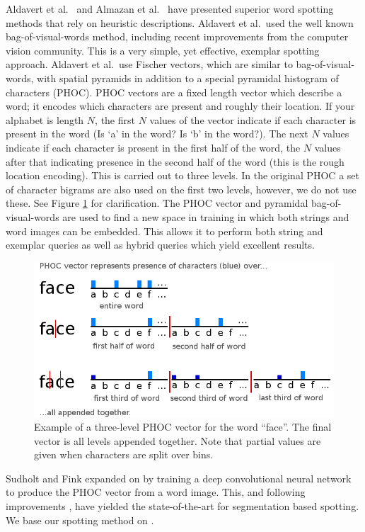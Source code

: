 \documentclass[ms,electronic,twosidetoc,letterpaper,chaptercenter,parttop,lof,lot]{byumsphd}
\begin{document}
Aldavert et al.~\cite{Aldavert2015} and Almazan et al.~\cite{Almazan2014} have presented superior word spotting methods that rely on heuristic descriptions. Aldavert et al.~used the well known bag-of-visual-words method, including recent improvements from the computer vision community. This is a very simple, yet effective, exemplar spotting approach. Aldavert et al.~use Fischer vectors, which are similar to bag-of-visual-words, with spatial pyramids in addition to a special pyramidal histogram of characters (PHOC).
PHOC vectors are a fixed length vector which describe a word; it encodes which characters are present and roughly their location. If your alphabet is length $N$, the first $N$ values of the vector indicate if each character is present in the word (Is `a' in the word? Is `b' in the word?). The next $N$ values indicate if each character is present in the first half of the word, the $N$ values after that indicating presence in the second half of the word (this is the rough location encoding). This is carried out to three levels. In the original PHOC a set of character bigrams are also used on the first two levels, however, we do not use these. See Figure \ref{fig:phoc} for clarification.
The PHOC vector and pyramidal bag-of-visual-words are used to find a new space in training in which both strings and word images can be embedded. This allows it to perform both string and exemplar queries as well as hybrid queries which yield excellent results.

\begin{figure}[t]
    \centering
    \includegraphics[width=.65\textwidth]{phoc}
    \caption{Example of a three-level PHOC vector for the word ``face''. The final vector is all levels appended together. Note that partial values are given when characters are split over bins.}
    \label{fig:phoc}
\end{figure}

Sudholt and Fink \cite{sudholt2016,sudholt2017} expanded on \cite{Almazan2014} by training a deep convolutional neural network to produce the PHOC vector from a word image. This, and following improvements \cite{krishnan2016, retsinasTrans2017}, have yielded the state-of-the-art for segmentation based spotting. We base our spotting method on \cite{sudholt2017}.
\end{document}

